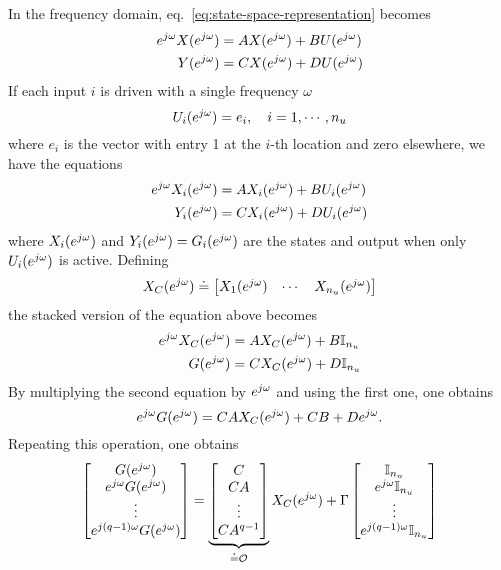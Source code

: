 In the frequency domain, eq.~\eqref{eq:state-space-representation} becomes
\begin{equation*}
  \begin{aligned}
    e^{j\omega} X(e^{j\omega}) &= AX(e^{j\omega}) + BU(e^{j\omega}) \\
    Y(e^{j\omega}) &= CX(e^{j\omega}) + DU(e^{j\omega})
  \end{aligned}
\end{equation*}
If each input $i$ is driven with a single frequency $\omega$
\begin{equation*}
  U_i(e^{j\omega}) = e_i, \hspace{1em}i=1,\cdots, n_u
\end{equation*}
where $e_i$ is the vector with entry 1 at the $i$-th location and zero elsewhere, we have the equations
\begin{equation*}
  \begin{aligned}
    e^{j\omega} X_i(e^{j\omega}) &= AX_i(e^{j\omega}) + BU_i(e^{j\omega}) \\
    Y_i(e^{j\omega}) &= CX_i(e^{j\omega}) + DU_i(e^{j\omega})
  \end{aligned}
\end{equation*}
where $X_i(e^{j\omega})$ and $Y_i(e^{j\omega})=G_i(e^{j\omega})$ are the states and output when only $U_i(e^{j\omega})$ is active. Defining
\begin{equation*}
  X_C(e^{j\omega}) \doteq
  \begin{bmatrix}
    X_1(e^{j\omega}) & \cdots & X_{n_u}(e^{j\omega})
  \end{bmatrix}
\end{equation*}
the stacked version of the equation above becomes
\begin{equation*}
  \begin{aligned}
    e^{j\omega} X_C(e^{j\omega}) &= AX_C(e^{j\omega}) + B\mathbb{I}_{n_u} \\
    G(e^{j\omega}) &= CX_C(e^{j\omega}) + D\mathbb{I}_{n_u}
  \end{aligned}
\end{equation*}
By multiplying the second equation by $e^{j\omega}$ and using the first one, one obtains
\begin{equation*}
  e^{j\omega} G(e^{j\omega}) = CAX_C(e^{j\omega}) + CB + De^{j\omega}.
\end{equation*}
Repeating this operation, one obtains
\begin{equation*}
  \begin{bmatrix}
    G(e^{j\omega}) \\ e^{j\omega} G(e^{j\omega}) \\ \vdots \\ e^{j(q-1)\omega} G(e^{j\omega})
  \end{bmatrix} =
  \underbrace{\begin{bmatrix}
    C \\ CA \\\vdots \\ CA^{q-1}
  \end{bmatrix}}_{\doteq \mathcal{O}} X_C(e^{j\omega}) + \Gamma
\begin{bmatrix}
  \mathbb{I}_{n_u} \\ e^{j\omega} \mathbb{I}_{n_u} \\ \vdots \\ e^{j(q-1)\omega} \mathbb{I}_{n_u}
\end{bmatrix}
\end{equation*}
